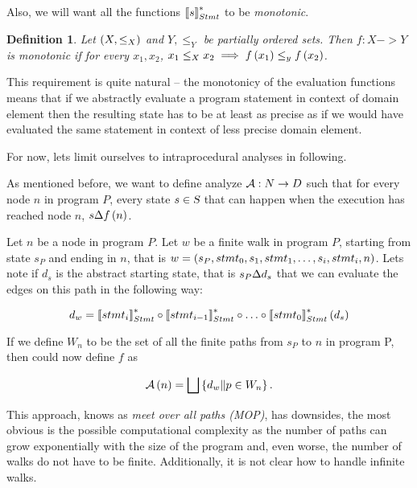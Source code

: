 \documentclass[..thesis.tex]{subfiles}
\newtheorem{defin}{Definition}[section]
\begin{document}
Also, we will want all the functions $\left\llbracket s \right\rrbracket_{Stmt}^{*}$ to be \textit{monotonic}.

\begin{defin}
Let $\left( X, \leq_X \right)$ and $Y, \leq_Y$ be partially ordered sets. Then $f : X -> Y$ is \textit{monotonic} if for every $x_1, x_2$, $x_1 \leq_X x_2 \implies f \left( x_1 \right) \leq_y f \left( x_2 \right)$.   
\end{defin}

This requirement is quite natural -- the monotonicy of the evaluation functions means that if we abstractly evaluate a program statement in context of domain element then the resulting state has to be at least as precise as if we would have evaluated the same statement in context of less precise domain element.  

For now, lets limit ourselves to intraprocedural analyses in following.
 
As mentioned before, we want to define analyze $\mathcal{A} : N \to D$ such that for every node $n$ in program $P$, every state $s \in \textsl{S}$ that can happen when the execution has reached node $n$, $s \Delta f \left( n \right)$.
  
Let $n$ be a node in program $P$. Let $w$ be a finite walk in program $P$, starting from state $s_P$ and ending in $n$, that is $w = \left( s_P, stmt_0, s_1, stmt_1, \ldots, s_i, stmt_i, n \right)$. Lets note if $d_s$ is the abstract starting state, that is $s_P \Delta d_s$  that we can evaluate the edges on this path in the following way:

\begin{equation*}
d_w = \left\llbracket stmt_i \right\rrbracket_{Stmt}^{*} \circ \left\llbracket stmt_{i-1} \right\rrbracket_{Stmt}^{*} \circ \ldots \circ  \left\llbracket stmt_0 \right\rrbracket_{Stmt}^{*} \left( d_s \right)  
\end{equation*}
  
If we define $W_n$ to be the set of all the finite paths from $s_P$ to $n$ in program P, then could now define $f$ as

\begin{equation*}
\mathcal{A} \left( n \right) = \bigsqcup \left\lbrace d_w \| p \in W_n \right\rbrace \text{.} 
\end{equation*}  

This approach, knows as \textit{meet over all  paths (MOP)}, has downsides, the most obvious is the possible computational complexity as the number of paths can grow exponentially with the size of the program and, even worse, the number of walks do not have to be finite. Additionally, it is not clear how to handle infinite walks. 
\end{document}
